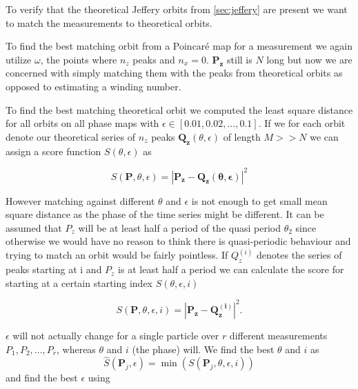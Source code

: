 \label{sec:matchorbit}
To verify that the theoretical Jeffery orbits from \ref{sec:jeffery} are present we want to match the measurements to theoretical orbits.

To find the best matching orbit from a Poincaré map for a measurement we again utilize $\omega$, the points where $n_z$ peaks and $n_x=0$. $\mathbf{P_z}$ still is $N$ long but now we are concerned with simply matching them with the peaks from theoretical orbits as opposed to estimating a winding number.


To find the best matching theoretical orbit we computed the least square distance for all orbits on all phase maps with $\epsilon \in [0.01, 0.02, ..., 0.1]$. If we for each orbit denote our theoretical series of $n_z$ peaks $\mathbf{Q_z}(\theta, \epsilon)$ of length $M >> N$ we can assign a score function $S(\theta, \epsilon)$ as

\begin{equation}
S(\mathbf{P}, \theta, \epsilon) = \left| \mathbf{P_z} - \mathbf{Q_z(\theta, \epsilon)} \right|^2
\end{equation}

However matching against different $\theta$ and $\epsilon$ is not enough to get small mean square distance as the phase of the time series might be different. It can be assumed that $P_z$ will be at least half a period of the quasi period 
$\theta_2$ since otherwise we would have no reason to think there is quasi-periodic behaviour and trying to match an 
orbit would be fairly pointless. If $Q_z^{(i)}$ denotes the series of peaks starting at i and  $P_z$ is at 
least half a period we can calculate the score for starting at a certain starting index $S(\theta, \epsilon, i)$

\begin{equation}
S(\mathbf{P}, \theta, \epsilon, i) = \left| \mathbf{P_z} - \mathbf{Q_z^{(i)}} \right|^2.
\end{equation}

$\epsilon$ will not actually change for a single particle over $r$ different measurements $P_1, P_2, ..., P_r$, whereas $\theta$ and $i$ (the phase) will. We find the best $\theta$ and $i$ as
\begin{equation}
\hat{S}(\mathbf{P}_j, \epsilon) =  \min(S(\mathbf{P}_j, \theta, \epsilon, i))
\end{equation}
and find the best $\epsilon$ using

